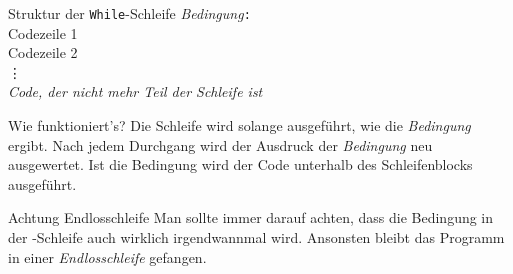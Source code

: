 \begin{frame}

\renewcommand{\baselinestretch}{1.5}
\begin{block}{Struktur der \texttt{While}-Schleife}
	\vspace{2pt}
	\pause {} \pause \textit{Bedingung}\pause\texttt{:} \pause \\
	\spacechar\spacechar Codezeile 1 \pause \\ 
	\spacechar\spacechar Codezeile 2 \pause \\
	\spacechar\spacechar \phantom{Code} \vdots \pause  \\
	\textit{Code, der nicht mehr Teil der Schleife ist}
\end{block}
\vspace{12pt}
\pause 
{}
\renewcommand{\baselinestretch}{1}
\begin{block}{Wie funktioniert's?}
	\vspace{2pt}
	Die Schleife wird solange ausgeführt, wie die \emph{Bedingung}  ergibt. Nach jedem Durchgang wird der Ausdruck der \emph{Bedingung} neu ausgewertet. 
	Ist die Bedingung  wird der Code unterhalb des Schleifenblocks ausgeführt. 
\end{block}

\end{frame}

\begin{frame}
\begin{alertblock}{Achtung Endlosschleife}
	\vspace{2pt}
	Man sollte immer darauf achten, dass die Bedingung in der -Schleife auch wirklich irgendwannmal  wird. Ansonsten bleibt das Programm in einer \emph{Endlosschleife} gefangen. 
\end{alertblock}
\end{frame}

